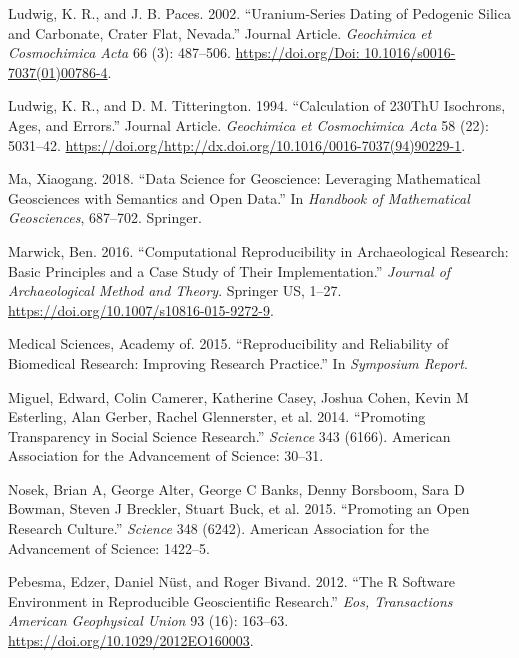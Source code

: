 \documentclass[]{elsarticle} %
\begin{document}
\leavevmode\hypertarget{ref-RN801}{}%
Ludwig, K. R., and J. B. Paces. 2002. ``Uranium-Series Dating of Pedogenic Silica and Carbonate, Crater Flat, Nevada.'' Journal Article. \emph{Geochimica et Cosmochimica Acta} 66 (3): 487--506. \href{https://doi.org/Doi:\%2010.1016/s0016-7037(01)00786-4}{https://doi.org/Doi: 10.1016/s0016-7037(01)00786-4}.

\leavevmode\hypertarget{ref-RN2155}{}%
Ludwig, K. R., and D. M. Titterington. 1994. ``Calculation of 230ThU Isochrons, Ages, and Errors.'' Journal Article. \emph{Geochimica et Cosmochimica Acta} 58 (22): 5031--42. \url{https://doi.org/http://dx.doi.org/10.1016/0016-7037(94)90229-1}.

\leavevmode\hypertarget{ref-ma2018data}{}%
Ma, Xiaogang. 2018. ``Data Science for Geoscience: Leveraging Mathematical Geosciences with Semantics and Open Data.'' In \emph{Handbook of Mathematical Geosciences}, 687--702. Springer.

\leavevmode\hypertarget{ref-Marwick2016repro}{}%
Marwick, Ben. 2016. ``Computational Reproducibility in Archaeological Research: Basic Principles and a Case Study of Their Implementation.'' \emph{Journal of Archaeological Method and Theory}. Springer US, 1--27. \url{https://doi.org/10.1007/s10816-015-9272-9}.

\leavevmode\hypertarget{ref-academy2015reproducibility}{}%
Medical Sciences, Academy of. 2015. ``Reproducibility and Reliability of Biomedical Research: Improving Research Practice.'' In \emph{Symposium Report}.

\leavevmode\hypertarget{ref-miguel2014promoting}{}%
Miguel, Edward, Colin Camerer, Katherine Casey, Joshua Cohen, Kevin M Esterling, Alan Gerber, Rachel Glennerster, et al. 2014. ``Promoting Transparency in Social Science Research.'' \emph{Science} 343 (6166). American Association for the Advancement of Science: 30--31.

\leavevmode\hypertarget{ref-nosek2015promoting}{}%
Nosek, Brian A, George Alter, George C Banks, Denny Borsboom, Sara D Bowman, Steven J Breckler, Stuart Buck, et al. 2015. ``Promoting an Open Research Culture.'' \emph{Science} 348 (6242). American Association for the Advancement of Science: 1422--5.

\leavevmode\hypertarget{ref-Pebesma_Nust_Bivand_2012}{}%
Pebesma, Edzer, Daniel Nüst, and Roger Bivand. 2012. ``The R Software Environment in Reproducible Geoscientific Research.'' \emph{Eos, Transactions American Geophysical Union} 93 (16): 163--63. \url{https://doi.org/10.1029/2012EO160003}.
\end{document}
